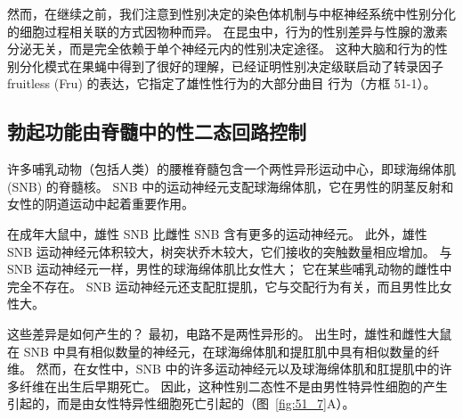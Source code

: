 然而，在继续之前，我们注意到性别决定的染色体机制与中枢神经系统中性别分化的细胞过程相关联的方式因物种而异。
在昆虫中，行为的性别差异与性腺的激素分泌无关，而是完全依赖于单个神经元内的性别决定途径。
这种大脑和行为的性别分化模式在果蝇中得到了很好的理解，已经证明性别决定级联启动了转录因子 fruitless (Fru) 的表达，它指定了雄性性行为的大部分曲目 行为（方框 51-1）。



\subsection{勃起功能由脊髓中的性二态回路控制}

许多哺乳动物（包括人类）的腰椎脊髓包含一个两性异形运动中心，即球海绵体肌 (SNB) 的脊髓核。
SNB 中的运动神经元支配球海绵体肌，它在男性的阴茎反射和女性的阴道运动中起着重要作用。


在成年大鼠中，雄性 SNB 比雌性 SNB 含有更多的运动神经元。
此外，雄性 SNB 运动神经元体积较大，树突状乔木较大，它们接收的突触数量相应增加。
与 SNB 运动神经元一样，男性的球海绵体肌比女性大；
它在某些哺乳动物的雌性中完全不存在。
SNB 运动神经元还支配肛提肌，它与交配行为有关，而且男性比女性大。


这些差异是如何产生的？
最初，电路不是两性异形的。
出生时，雄性和雌性大鼠在 SNB 中具有相似数量的神经元，在球海绵体肌和提肛肌中具有相似数量的纤维。
然而，在女性中，SNB 中的许多运动神经元以及球海绵体肌和肛提肌中的许多纤维在出生后早期死亡。
因此，这种性别二态性不是由男性特异性细胞的产生引起的，而是由女性特异性细胞死亡引起的（图~\ref{fig:51_7}A）。


